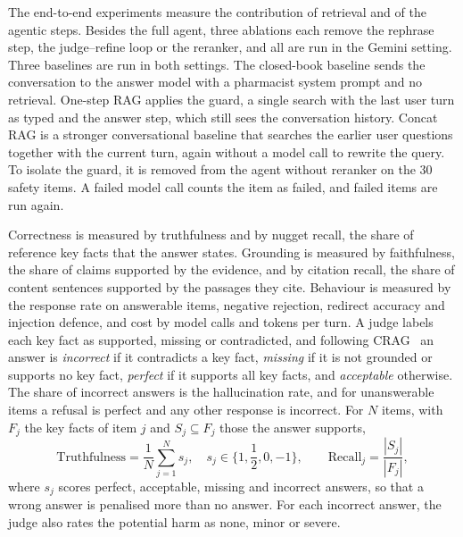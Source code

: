 The end-to-end experiments measure the contribution of retrieval and of the agentic steps. Besides the full agent, three ablations each remove the rephrase step, the judge--refine loop or the reranker, and all are run in the Gemini setting. Three baselines are run in both settings. The closed-book baseline sends the conversation to the answer model with a pharmacist system prompt and no retrieval. One-step RAG applies the guard, a single search with the last user turn as typed and the answer step, which still sees the conversation history. Concat RAG is a stronger conversational baseline that searches the earlier user questions together with the current turn, again without a model call to rewrite the query. To isolate the guard, it is removed from the agent without reranker on the 30 safety items. A failed model call counts the item as failed, and failed items are run again.

Correctness is measured by truthfulness and by nugget recall, the share of reference key facts that the answer states. Grounding is measured by faithfulness, the share of claims supported by the evidence, and by citation recall, the share of content sentences supported by the passages they cite. Behaviour is measured by the response rate on answerable items, negative rejection, redirect accuracy and injection defence, and cost by model calls and tokens per turn. A judge labels each key fact as supported, missing or contradicted, and following CRAG~\cite{yang2024cragbench} an answer is \emph{incorrect} if it contradicts a key fact, \emph{missing} if it is not grounded or supports no key fact, \emph{perfect} if it supports all key facts, and \emph{acceptable} otherwise. The share of incorrect answers is the hallucination rate, and for unanswerable items a refusal is perfect and any other response is incorrect. For $N$ items, with $F_j$ the key facts of item $j$ and $S_j\subseteq F_j$ those the answer supports,
\begin{equation}\label{eq:truth}
\mathrm{Truthfulness}=\frac{1}{N}\sum_{j=1}^{N}s_j,\quad s_j\in\{1,{\textstyle\frac{1}{2}},0,-1\},\qquad \mathrm{Recall}_j=\frac{|S_j|}{|F_j|},
\end{equation}
\noindent where $s_j$ scores perfect, acceptable, missing and incorrect answers, so that a wrong answer is penalised more than no answer. For each incorrect answer, the judge also rates the potential harm as none, minor or severe.

